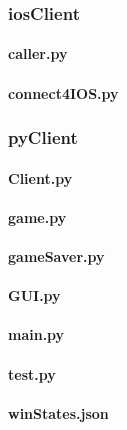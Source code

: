 \documentclass[12pt]{article}
\newcommand{\incFile}[2]{\label{code:#2}}
\begin{document}
\subsubsection{iosClient}												%
\paragraph{caller.py}														\incFile{python}{Clients/iosClient/caller.py}
\paragraph{connect4IOS.py}											\incFile{python}{Clients/iosClient/connect4IOS.py}
\subsubsection{pyClient}												%
\paragraph{Client.py}														\incFile{python}{Clients/pyClient/Client.py}
\paragraph{game.py}														\incFile{python}{Clients/pyClient/game.py}
\paragraph{gameSaver.py}												\incFile{python}{Clients/pyClient/gameSaver.py}
\paragraph{GUI.py}															\incFile{python}{Clients/pyClient/GUI.py}
\paragraph{main.py}														\incFile{python}{Clients/pyClient/main.py}
\paragraph{test.py}														\incFile{python}{Clients/pyClient/test.py}
\paragraph{winStates.json}											\incFile{python}{Clients/pyClient/winStates.json}
\end{document}
